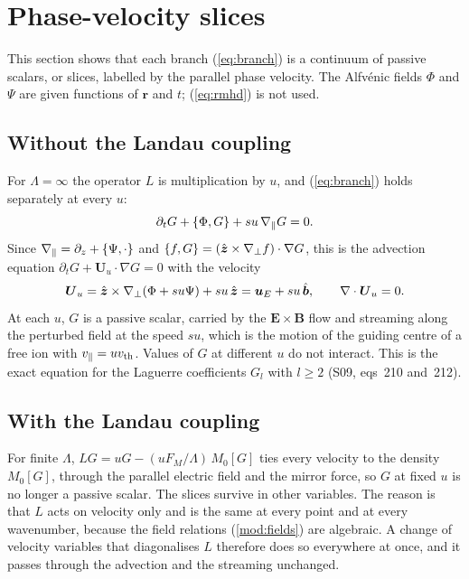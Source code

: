 \section{Phase-velocity slices}\label{sec:slices}

This section shows that each branch (\ref{eq:branch}) is a continuum of passive scalars, or slices, labelled by the parallel phase velocity. The Alfv\'enic fields $\Phi$ and $\Psi$ are given functions of $\boldsymbol r$ and $t$; (\ref{eq:rmhd}) is not used.

\subsection{Without the Landau coupling}\label{sl:nocoupling}

For $\Lambda=\infty$ the operator $L$ is multiplication by $u$, and (\ref{eq:branch}) holds separately at every $u$:
\begin{equation*}
  \partial_tG+\{\Phi,G\}+su\,\nabla_\parallel G=0 .
\end{equation*}
Since $\nabla_\parallel=\partial_z+\{\Psi,\cdot\}$ and $\{f,G\}=(\hat{\boldsymbol z}\times\nabla_\perp f)\cdot\nabla G$, this is the advection equation $\partial_tG+\boldsymbol U_u\cdot\nabla G=0$ with the velocity
\begin{equation}\label{eq:Uu}
  \boldsymbol U_u=\hat{\boldsymbol z}\times\nabla_\perp(\Phi+su\Psi)+su\,\hat{\boldsymbol z}=\boldsymbol u_E+su\,\hat{\boldsymbol b},\qquad\nabla\cdot\boldsymbol U_u=0 .
\end{equation}
At each $u$, $G$ is a passive scalar, carried by the $\boldsymbol E\times\boldsymbol B$ flow and streaming along the perturbed field at the speed $su$, which is the motion of the guiding centre of a free ion with $v_\parallel=uv_{\mathrm{th}}$. Values of $G$ at different $u$ do not interact. This is the exact equation for the Laguerre coefficients $G_l$ with $l\ge2$ (S09, eqs~210 and~212).

\subsection{With the Landau coupling}\label{sl:transformsec}

For finite $\Lambda$, $LG=uG-(uF_M/\Lambda)\,M_0[G]$ ties every velocity to the density $M_0[G]$, through the parallel electric field and the mirror force, so $G$ at fixed $u$ is no longer a passive scalar. The slices survive in other variables. The reason is that $L$ acts on velocity only and is the same at every point and at every wavenumber, because the field relations (\ref{mod:fields}) are algebraic. A change of velocity variables that diagonalises $L$ therefore does so everywhere at once, and it passes through the advection and the streaming unchanged.

